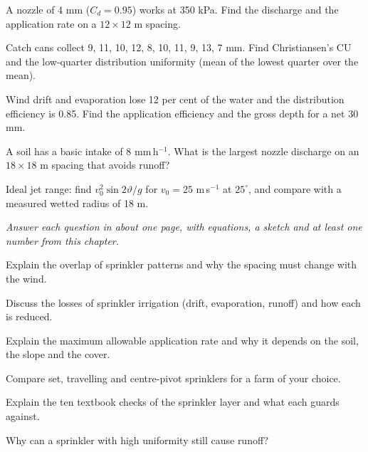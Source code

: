 \begin{exlist}
\item A nozzle of 4 mm ($C_d=0.95$) works at 350 kPa. Find the discharge and the application rate on a $12\times12$ m spacing.
\item Catch cans collect 9, 11, 10, 12, 8, 10, 11, 9, 13, 7 mm. Find Christiansen's CU and the low-quarter distribution uniformity (mean of the lowest quarter over the mean).
\item Wind drift and evaporation lose 12 per cent of the water and the distribution efficiency is 0.85. Find the application efficiency and the gross depth for a net 30 mm.
\item A soil has a basic intake of 8 mm\,h$^{-1}$. What is the largest nozzle discharge on an $18\times18$ m spacing that avoids runoff?
\item Ideal jet range: find $v_0^2\sin2\vartheta/g$ for $v_0=25$ m\,s$^{-1}$ at $25^\circ$, and compare with a measured wetted radius of 18 m.
\end{exlist}
{\small\itshape Answer each question in about one page, with equations, a sketch and at least one number from this chapter.}\par\vspace{3pt}
\begin{exlist}
\item Explain the overlap of sprinkler patterns and why the spacing must change with the wind.
\item Discuss the losses of sprinkler irrigation (drift, evaporation, runoff) and how each is reduced.
\item Explain the maximum allowable application rate and why it depends on the soil, the slope and the cover.
\item Compare set, travelling and centre-pivot sprinklers for a farm of your choice.
\item Explain the ten textbook checks of the sprinkler layer and what each guards against.
\item Why can a sprinkler with high uniformity still cause runoff?
\end{exlist}
